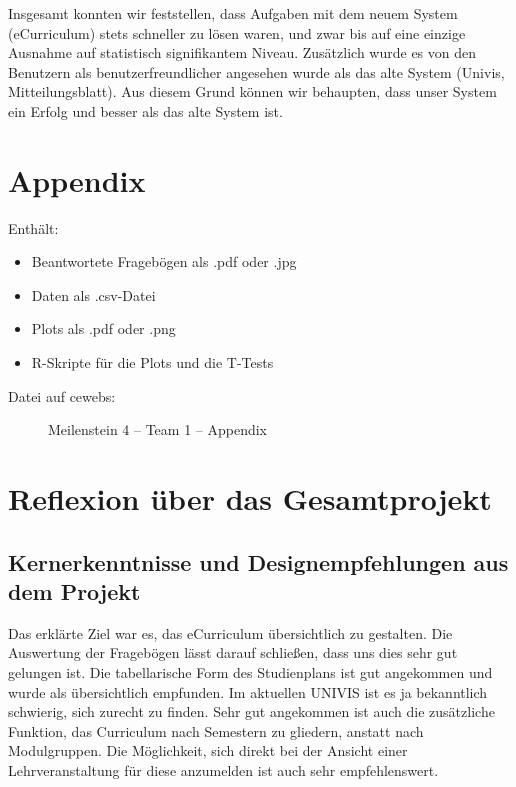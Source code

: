 \documentclass[a4paper,10pt]{scrartcl}
\begin{document}
Insgesamt konnten wir feststellen, dass Aufgaben mit dem neuem System (eCurriculum) stets schneller zu lösen waren, und zwar bis auf eine einzige Ausnahme auf statistisch signifikantem Niveau. Zusätzlich wurde es von den Benutzern als benutzerfreundlicher angesehen wurde als das alte System (Univis, Mitteilungsblatt). Aus diesem Grund können
wir behaupten, dass unser System ein Erfolg und besser als das alte System ist.

\section{Appendix}

Enthält:

\begin{itemize}
 \item Beantwortete Fragebögen als .pdf oder .jpg
 \item Daten als .csv-Datei
 \item Plots als .pdf oder .png
 \item R-Skripte für die Plots und die T-Tests
\end{itemize}

\begin{description}
 \item[Datei auf cewebs:] Meilenstein 4 -- Team 1 -- Appendix
\end{description}

\pagebreak

\section{Reflexion über das Gesamtprojekt}

\subsection{Kernerkenntnisse und Designempfehlungen aus dem Projekt}

% 

Das erklärte Ziel war es, das eCurriculum übersichtlich zu gestalten. Die Auswertung der Fragebögen lässt darauf schließen, dass uns dies sehr gut gelungen ist.
Die tabellarische Form des Studienplans ist gut angekommen und wurde als übersichtlich empfunden. Im aktuellen UNIVIS ist es ja bekanntlich schwierig, sich zurecht zu finden. 
Sehr gut angekommen ist auch die zusätzliche Funktion, das Curriculum nach Semestern zu gliedern, anstatt nach Modulgruppen. 
Die Möglichkeit, sich direkt bei der Ansicht einer Lehrveranstaltung für diese anzumelden ist auch sehr empfehlenswert.
\end{document}
